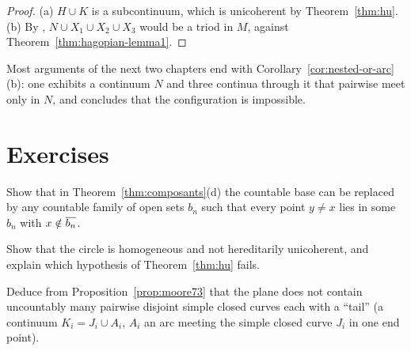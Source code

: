 \begin{proof}
(a) $H\cup K$ is a subcontinuum, which is unicoherent by Theorem~\ref{thm:hu}. (b) By
, $N\cup X_1\cup X_2\cup X_3$ would be a triod in $M$, against
Theorem~\ref{thm:hagopian-lemma1}.
\end{proof}


Most arguments of the next two chapters end with Corollary~\ref{cor:nested-or-arc}(b): one exhibits a
continuum $N$ and three continua through it that pairwise meet only in $N$, and concludes that the
configuration is impossible.

\section*{Exercises}

\begin{exercise}
Show that in Theorem~\ref{thm:composants}(d) the countable base can be replaced by any countable family of
open sets $b_n$ such that every point $y\ne x$ lies in some $b_n$ with $x\notin\overline{b_n}$.
\end{exercise}

\begin{exercise}
Show that the circle is homogeneous and not hereditarily unicoherent, and explain which hypothesis of
Theorem~\ref{thm:hu} fails.
\end{exercise}

\begin{exercise}
Deduce from Proposition~\ref{prop:moore73} that the plane does not contain uncountably many pairwise disjoint
simple closed curves each with a ``tail'' (a continuum $K_i=J_i\cup A_i$, $A_i$ an arc meeting the simple closed
curve $J_i$ in one end point).
\end{exercise}
